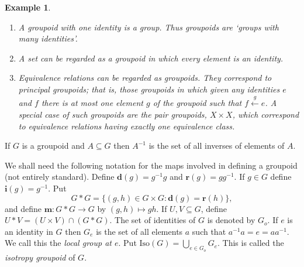 \documentclass[a4paper]{amsart}
\newtheorem{example}[theorem]{Example}
\begin{document}
\begin{example}{\em \mbox{}
\begin{enumerate}
\item A groupoid with one identity is a group.
Thus groupoids are `groups with many identities'.

\item A set can be regarded as a groupoid in which every element is an identity.

\item Equivalence relations can be regarded as groupoids.
They correspond to {\em principal groupoids}; that is, those groupoids in which given any identities $e$ and $f$ there is at most one element $g$ of the groupoid
such that $f \stackrel{g}{\longleftarrow} e$.
A special case of such groupoids are the {\em pair groupoids}, $X \times X$, which correspond
to equivalence relations having exactly one equivalence class.


\end{enumerate}
}
\end{example}


If $G$ is a groupoid and $A \subseteq G$ then $A^{-1}$ is the set
of all inverses of elements of $A$. 

We shall need the following notation for the maps involved in defining a groupoid (not entirely standard).
Define $\mathbf{d}(g) = g^{-1}g$ and $\mathbf{r}(g) = gg^{-1}$.
If $g \in G$ define $\mathbf{i}(g) = g^{-1}$.
Put 
$$G \ast G = \{ (g,h) \in G \times G \colon \mathbf{d}(g) = \mathbf{r}(h) \},$$
and define $\mathbf{m} \colon G \ast G \rightarrow G$ by $(g,h) \mapsto gh$.
If $U,V \subseteq G$, define $U \ast V = (U \times V) \cap (G \ast G)$.
The set of identities of $G$ is denoted by $G_{o}$.
If $e$ is an identity in $G$ then $G_{e}$ is the set of all elements $a$ such that
$a^{-1}a = e = aa^{-1}$.
We call this the {\em local group at $e$}.
Put $\mbox{Iso}(G) = \bigcup_{e \in G_{o}} G_{e}$.
This is called the {\em isotropy groupoid} of $G$.
\end{document}
